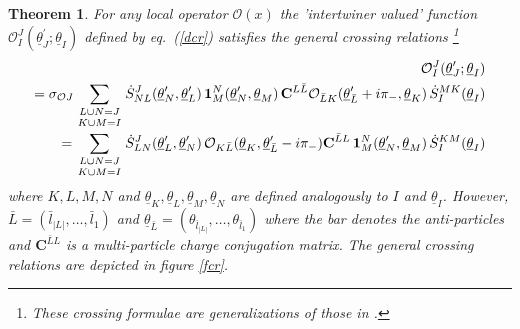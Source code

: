 \documentclass[a4paper,a4paper]{article}
\newtheorem{theorem}{Theorem}
\begin{document}
\begin{theorem}
\label{tcros}For any local operator $\mathcal{O}(x)$ the 'intertwiner
valued' function \newline
$\mathcal{O}_{I}^{J}(\underline{\theta }_{J}^{\prime };\underline{\theta }%
_{I})$ defined by eq.~(\ref{dcr}) satisfies the general crossing relations%
\footnote{%
These crossing formulae are generalizations of those in \cite{Q}.} 
\begin{align}
\mathcal{O}_{I}^{J}(\underline{\theta }_{J}^{\prime };\underline{\theta }%
_{I})  \label{cross} \\
=\sigma _{\mathcal{O}J}\sum_{\genfrac{}{}{0pt}1{L\cup N=J}{K\cup M=I}}\dot{S}%
_{NL}^{J}(\underline{\theta }_{N}^{\prime },\underline{\theta }_{L}^{\prime
})\,\mathbf{1}_{M}^{N}(\underline{\theta }_{N}^{\prime },\underline{\theta }%
_{M})\,\mathbf{C}^{L\bar{L}}\mathcal{O}_{\bar{L}K}(\underline{\theta }_{\bar{%
L}}^{\prime }+i\pi _{-},\underline{\theta }_{K})\,\dot{S}_{I}^{MK}(%
\underline{\theta }_{I})  \nonumber \\
=\sum_{\genfrac{}{}{0pt}1{L\cup N=J}{K\cup M=I}}\dot{S}_{LN}^{J}(\underline{%
\theta }_{L}^{\prime },\underline{\theta }_{N}^{\prime })\,\mathcal{O}_{K%
\bar{L}}(\underline{\theta }_{K},\underline{\theta }_{\bar{L}}^{\prime
}-i\pi _{-})\mathbf{C}^{\bar{L}L}\,\mathbf{1}_{M}^{N}(\underline{\theta }%
_{N}^{\prime },\underline{\theta }_{M})\,\dot{S}_{I}^{KM}(\underline{\theta }%
_{I})  \nonumber
\end{align}
where $K,L,M,N$ and $\underline{\theta }_{K},\underline{\theta }_{L},%
\underline{\theta }_{M},\underline{\theta }_{N}$ are defined analogously to $%
I$ and $\underline{\theta }_{I}$. However, $\bar{L}=(\bar{l}_{|L|},\dots ,%
\bar{l}_{1})$ and $\underline{\theta }_{\bar{L}}=(\theta _{\bar{l}%
_{|L|}},\dots ,\theta _{\bar{l}_{1}})$ where the bar denotes the
anti-particles and $\mathbf{C}^{\bar{L}L}$ is a multi-particle charge
conjugation matrix. The general crossing relations are depicted in figure 
\ref{fcr}.
\end{theorem}
\end{document}
